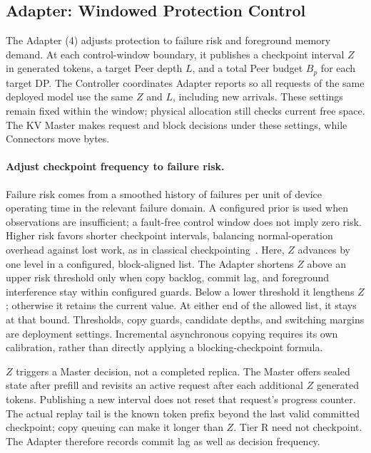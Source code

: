 \subsection{Adapter: Windowed Protection Control}
\label{sec:kv-runtime}
\label{sec:capacity-allocation}

The Adapter (4) adjusts protection to failure risk and foreground
memory demand. At each control-window boundary, it publishes a checkpoint interval $Z$ in
generated tokens, a target Peer depth $L$, and a total Peer budget $B_p$
for each target DP. The Controller coordinates Adapter reports so all
requests of the same deployed model use the same $Z$ and $L$, including
new arrivals. These settings remain fixed within the window; physical
allocation still checks current free space. The KV Master makes request
and block decisions under these settings, while Connectors move bytes.

\paragraph{Adjust checkpoint frequency to failure risk.}
Failure risk comes from a smoothed history of failures per unit of
device operating time in the relevant failure domain. A configured
prior is used when observations are insufficient; a fault-free control
window does not imply zero risk. Higher risk favors shorter checkpoint
intervals, balancing normal-operation overhead against lost work, as in
classical checkpointing~\cite{daly2006checkpoint}. Here, $Z$ advances by
one level in a configured, block-aligned list. The Adapter shortens $Z$
above an upper risk threshold only when copy backlog, commit lag, and
foreground interference stay within configured guards. Below a lower
threshold it lengthens $Z$; otherwise it retains the current value.
At either end of the allowed list, it stays at that bound. Thresholds,
copy guards, candidate depths, and switching margins are deployment settings.
Incremental asynchronous copying requires its own calibration, rather
than directly applying a blocking-checkpoint formula.

$Z$ triggers a Master decision, not a completed replica. The Master
offers sealed state after prefill and revisits an active request after
each additional $Z$ generated tokens. Publishing a new interval does
not reset that request's progress counter. The actual replay tail is
the known token prefix beyond the last valid committed checkpoint;
copy queuing can make it longer than $Z$. Tier R need not checkpoint.
The Adapter therefore records commit lag as well as decision frequency.

